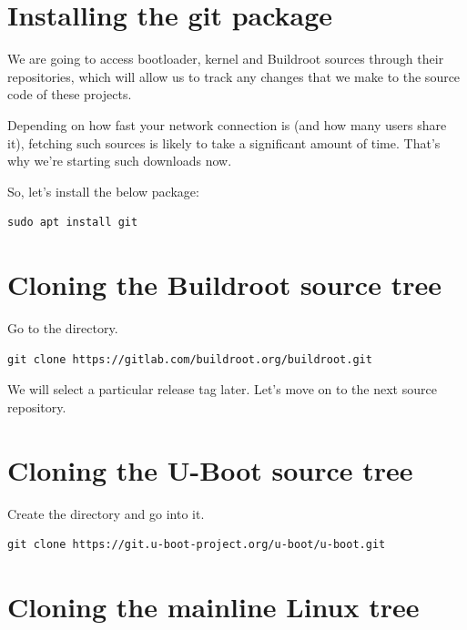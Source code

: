 
\section{Installing the git package}

We are going to access bootloader, kernel and Buildroot sources through
their  repositories, which will allow us to track any changes
that we make to the source code of these projects.

Depending on how fast your network connection is (and how many users
share it), fetching such sources is likely to take a significant amount
of time. That's why we're starting such downloads now.

So, let's install the below package:

\begin{verbatim}
sudo apt install git
\end{verbatim}

\section{Cloning the Buildroot source tree}

Go to the  directory.

\begin{verbatim}
git clone https://gitlab.com/buildroot.org/buildroot.git
\end{verbatim}

We will select a particular release tag later. Let's move on to the next
source repository.

\section{Cloning the U-Boot source tree}

Create the  directory and go
into it.

\begin{verbatim}
git clone https://git.u-boot-project.org/u-boot/u-boot.git
\end{verbatim}

\section{Cloning the mainline Linux tree}

